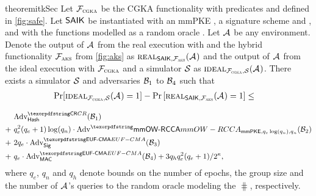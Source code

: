 \newcommand{\ucideal}{\textnormal{\textsc{ideal}}}
\newcommand{\ucreal}{\textnormal{\textsc{real}}}
\begin{restatable}{theorem}{itkSec}\label{thm:saik-security}
	Let $\funcCGKA$ be the CGKA functionality with predicates \KwConf{} and \KwAuth{} defined in \cref{fig:safe}. Let $\saik$ be instantiated with an mmPKE \mmPKE, a signature scheme \sigscheme and \mac, and with the \hkdf functions modelled as a random oracle \hash.
	Let $\Adv$ be any environment. Denote the output of $\Adv$ from the real execution with \saik and the hybrid functionality $\funcPKI$ from \cref{fig:aks} as $\ucreal_{\saik, \funcPKI}(\Adv)$ and the output of $\Adv$ from the ideal execution with $\funcCGKA$ and a simulator $\ucsim$ as $\ucideal_{\funcCGKA, \ucsim}(\Adv)$.
	There exists a simulator $\ucsim$ and adversaries $\Bdv[1]$ to $\Bdv[4]$ such that
	\begin{align*}
		\Pr[\ucideal&_{\funcCGKA, \ucsim}(\Adv) = 1] - \Pr\left[\ucreal_{\saik, \funcPKI}(\Adv) = 1\right] \leq
	\end{align*}

	\begin{align*}
		&\textnormal{Adv}^{\gamefont{CR}}_{\hash}(\Bdv[1]) \\
	+\ & q_e^2(q_e+1) \log(q_n) \cdot\textnormal{Adv}^\mmowrcca_{\mmPKE,q_e\log(q_n),q_n}(\Bdv[2]) \\
	+\ & 2q_e\cdot \textnormal{Adv}^{\ufcma}_\sigscheme(\Bdv[3]) \\
	+\ & q_e \cdot \textnormal{Adv}^{\ufcma}_\mac(\Bdv[4]) + 3q_hq_e^2(q_e+1)/2^\kappa,
\end{align*}
	where $q_e$, $q_n$ and $q_h$ denote bounds on the number of epochs, the group size and the number of $\Adv$'s queries to the random oracle modeling the $\hash$, respectively.
  \end{restatable}

